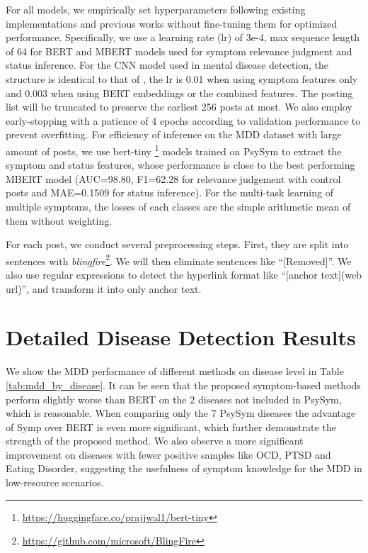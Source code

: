 For all models, we empirically set hyperparameters following existing implementations and previous works without fine-tuning them for optimized performance. Specifically, we use a learning rate (lr) of 3e-4, max sequence length of 64 for BERT and MBERT models used for symptom relevance judgment and status inference. For the CNN model used in mental disease detection, the structure is identical to that of \citet{nguyen2022improving}, the lr is 0.01 when using symptom features only and 0.003 when using BERT embeddings or the combined features. The posting list will be truncated to preserve the earliest 256 posts at most. We also employ early-stopping with a patience of 4 epochs according to validation performance to prevent overfitting. For efficiency of inference on the MDD dataset with large amount of posts, we use bert-tiny \footnote{\url{https://huggingface.co/prajjwal1/bert-tiny}} models trained on PsySym to extract the symptom and status features, whose performance is close to the best performing MBERT model (AUC=98.80, F1=62.28 for relevance judgement with control posts and MAE=0.1509 for status inference). For the multi-task learning of multiple symptoms, the losses of each classes are the simple arithmetic mean of them without weighting. 

For each post, we conduct several preprocessing steps. First, they are split into sentences with \textit{blingfire}\footnote{\url{https://github.com/microsoft/BlingFire}}. We will then eliminate sentences like ``[Removed]''. We also use regular expressions to detect the hyperlink format like ``[anchor text](web url)'', and transform it into only anchor text.

\section{Detailed Disease Detection Results}
\label{apd:mdd_results}

We show the MDD performance of different methods on disease level in Table \ref{tab:mdd_by_disease}. It can be seen that the proposed symptom-based methods perform slightly worse than BERT on the 2 diseases not included in PsySym, which is reasonable. When comparing only the 7 PsySym diseases the advantage of Symp over BERT is even more significant, which further demonstrate the strength of the proposed method. We also observe a more significant improvement on diseases with fewer positive samples like OCD, PTSD and Eating Disorder, suggesting the usefulness of symptom knowledge for the MDD in low-resource scenarios.

